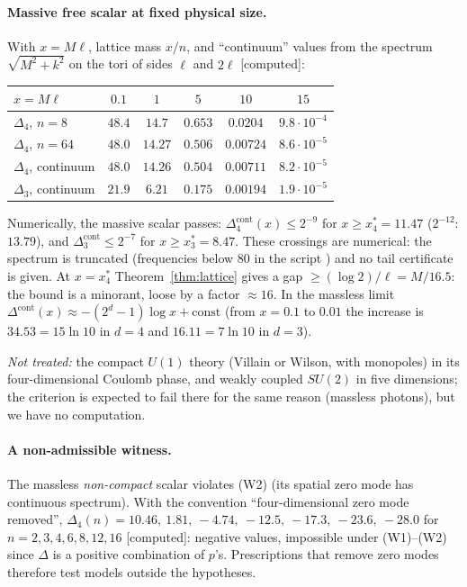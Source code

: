 \documentclass[11pt,a4paper]{article}
\theoremstyle{plain}
\theoremstyle{definition}
\theoremstyle{remark}
\numberwithin{equation}{section}
\newcommand{\st}[1]{\textsf{[#1]}}
\begin{document}
\paragraph{Massive free scalar at fixed physical size.} With $x=M\ell$, lattice mass $x/n$, and ``continuum'' values from the spectrum
$\sqrt{M^2+k^2}$ on the tori of sides $\ell$ and $2\ell$ \st{computed}:
\begin{center}\footnotesize
\begin{tabular}{@{}lccccc@{}}
\toprule
$x=M\ell$ & $0.1$ & $1$ & $5$ & $10$ & $15$\\
\midrule
$\Delta_4$, $n=8$ & $48.4$ & $14.7$ & $0.653$ & $0.0204$ & $9.8\cdot10^{-4}$\\
$\Delta_4$, $n=64$ & $48.0$ & $14.27$ & $0.506$ & $0.00724$ & $8.6\cdot10^{-5}$\\
$\Delta_4$, continuum & $48.0$ & $14.26$ & $0.504$ & $0.00711$ & $8.2\cdot10^{-5}$\\
$\Delta_3$, continuum & $21.9$ & $6.21$ & $0.175$ & $0.00194$ & $1.9\cdot10^{-5}$\\
\bottomrule
\end{tabular}
\end{center}
Numerically, the massive scalar passes: $\Delta_4^{\mathrm{cont}}(x)\le2^{-9}$ for $x\ge x_4^*=11.47$ ($2^{-12}$: $13.79$), and
$\Delta_3^{\mathrm{cont}}\le2^{-7}$ for $x\ge x_3^*=8.47$. These crossings are numerical: the spectrum is truncated (frequencies below $80$ in the
script ) and no tail certificate is given. At $x=x_4^*$ Theorem~\ref{thm:lattice} gives a gap $\ge(\log2)/\ell=M/16.5$: the
bound is a minorant, loose by a factor $\approx16$. In the massless limit $\Delta^{\mathrm{cont}}(x)\approx-(2^d-1)\log x+\mathrm{const}$
(from $x=0.1$ to $0.01$ the increase is $34.53=15\ln10$ in $d=4$ and $16.11=7\ln10$ in $d=3$).

\emph{Not treated:} the compact $U(1)$ theory (Villain or Wilson, with monopoles) in its four-dimensional Coulomb phase, and
weakly coupled $SU(2)$ in five dimensions; the criterion is expected to fail there for the same reason (massless photons), but we have
no computation.

\paragraph{A non-admissible witness.} The massless \emph{non-compact} scalar violates (W2) (its spatial zero mode has continuous
spectrum). With the convention ``four-dimensional zero mode removed'', $\Delta_4(n)=10.46,\ 1.81,\ -4.74,\ -12.5,\ -17.3,\ -23.6,\
-28.0$ for $n=2,3,4,6,8,12,16$ \st{computed}: negative values, impossible under (W1)--(W2) since $\Delta$ is a positive combination of
$p$'s. Prescriptions that remove zero modes therefore test models outside the hypotheses.
\end{document}
